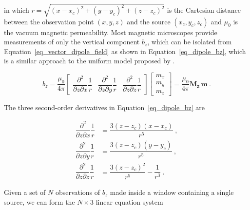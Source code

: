 \noindent
in which $r = \sqrt{(x - x_c)^2 + (y - y_c)^2 + (z - z_c)^2}$ is the Cartesian distance between the observation point $(x, y, z)$ and the source $(x_c, y_c, z_c)$ and $\mu_0$ is the vacuum magnetic permeability. Most magnetic microscopes provide measurements of only the vertical component $b_z$, which can be isolated from Equation~\ref{eq_vector_dipole_field} as shown in Equation~\ref{eq_dipole_bz}, which is a similar approach to the uniform model proposed by \cite{Weiss2007}.

\begin{equation}
\label{eq_dipole_bz}
b_z
= \dfrac{\mu_0}{4\pi}
\begin{bmatrix}
\dfrac{\partial^2}{\partial z \partial x} \dfrac{1}{r}
& \dfrac{\partial^2}{\partial z \partial y} \dfrac{1}{r}
& \dfrac{\partial^2}{\partial z \partial z} \dfrac{1}{r}
\end{bmatrix}
\begin{bmatrix}
m_x \\ m_y \\ m_z
\end{bmatrix}
= \dfrac{\mu_0}{4\pi} \mathbf{M_z}\,\mathbf{m}
\ .
\end{equation}

The three second-order derivatives in Equation~\ref{eq_dipole_bz} are

\begin{equation}
\begin{aligned}
\dfrac{\partial^2}{\partial z \partial x} \dfrac{1}{r} &=
\dfrac{3(z - z_c)(x - x_c)}{r^5}\ ,
\\
\dfrac{\partial^2}{\partial z \partial y} \dfrac{1}{r} &=
\dfrac{3(z - z_c)(y - y_c)}{r^5}\ ,
\\
\dfrac{\partial^2}{\partial z \partial z} \dfrac{1}{r} &=
\dfrac{3(z - z_c)^2}{r^5} - \dfrac{1}{r^3}\ .
\end{aligned}
\end{equation}

Given a set of $N$ observations of $b_z$ made inside a window containing a single source, we can form the $N \times 3$ linear equation system 

